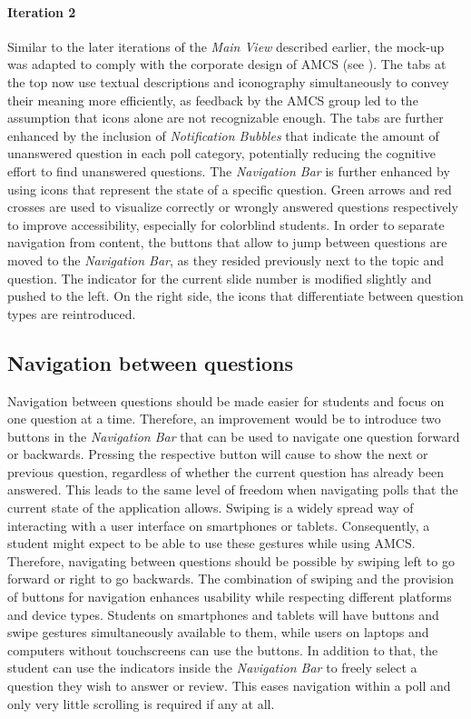 \paragraph{Iteration 2}
Similar to the later iterations of the \emph{Main View} described earlier, the mock-up was adapted to comply with the corporate design of AMCS (see ).
The tabs at the top now use textual descriptions and iconography simultaneously to convey their meaning more efficiently, as feedback by the AMCS group led to the assumption that icons alone are not recognizable enough. The tabs are further enhanced by the inclusion of \emph{Notification Bubbles} that indicate the amount of unanswered question in each poll category, potentially reducing the cognitive effort to find unanswered questions.
The \emph{Navigation Bar} is further enhanced by using icons that represent the state of a specific question. Green arrows and red crosses are used to visualize correctly or wrongly answered questions respectively to improve accessibility, especially for colorblind students.
In order to separate navigation from content, the buttons that allow to jump between questions are moved to the \emph{Navigation Bar}, as they resided previously next to the topic and question.
The indicator for the current slide number is modified slightly and pushed to the left. On the right side, the icons that differentiate between question types are reintroduced. 
\subsection{Navigation between questions}

Navigation between questions should be made easier for students and focus on one question at a time. Therefore, an improvement would be to introduce two buttons in the \emph{Navigation Bar} that can be used to navigate one question forward or backwards. Pressing the respective button will cause to show the next or previous question, regardless of whether the current question has already been answered. This leads to the same level of freedom when navigating polls that the current state of the application allows.
\newline
\newline
Swiping is a widely spread way of interacting with a user interface on smartphones or tablets. Consequently, a student might expect to be able to use these gestures while using AMCS. Therefore, navigating between questions should be possible by swiping left to go forward or right to go backwards. The combination of swiping and the provision of buttons for navigation enhances usability while respecting different platforms and device types. Students on smartphones and tablets will have buttons and swipe gestures simultaneously available to them, while users on laptops and computers without touchscreens can use the buttons.
In addition to that, the student can use the indicators inside the \emph{Navigation Bar} to freely select a question they wish to answer or review. This eases navigation within a poll and only very little scrolling is required if any at all.


